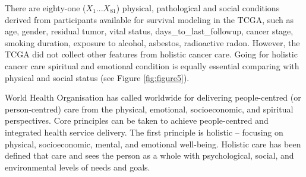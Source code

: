 \documentclass[12pt, a4paper]{article}
\begin{document}

There are eighty-one ($X_1 ... X_{81}$) physical, pathological and social conditions derived from participants available for survival modeling in the TCGA, %
such as age, gender, residual tumor, vital status, days\_to\_last\_followup, cancer stage, smoking duration, exposure to alcohol, asbestos, radioactive radon. 
However, the TCGA did not collect other features from holistic cancer care.
Going for holistic cancer care\citep{Mehta2019}\citep{Iftikhar2021} spiritual and emotional condition is equally essential comparing with physical and social status (see Figure \ref{fig:figure5}).

%
World Health Organisation has called worldwide for delivering people-centred (or person-centred) care from the physical, emotional, socioeconomic, and spiritual perspectives\citep{WHO2015}\citep{Ling-ChengMong2021}.
Core principles can be taken to achieve people-centred and integrated health service delivery. 
The first principle is holistic – focusing on physical, socioeconomic, mental, and emotional well-being. 
Holistic care has been defined that care and sees the person as a whole with psychological, social, and environmental levels of needs and goals.


\end{document}
